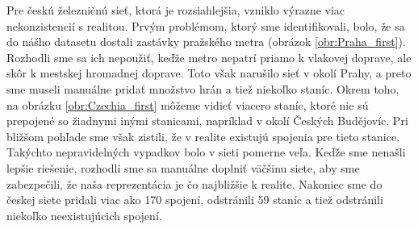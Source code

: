 \documentclass[main.tex]{subfiles}
\begin{document}
Pre českú železničnú sieť, ktorá je rozsiahlejšia, vzniklo výrazne viac nekonzistencií s realitou. Prvým problémom, ktorý sme identifikovali, bolo, že sa do nášho datasetu dostali zastávky pražského metra (obrázok \ref{obr:Praha_first}). Rozhodli sme sa ich nepoužiť, keďže metro nepatrí priamo k vlakovej doprave, ale skôr k mestskej hromadnej doprave. Toto však narušilo sieť v okolí Prahy, a preto sme museli manuálne pridať množstvo hrán a tiež niekoľko staníc. Okrem toho, na obrázku \ref{obr:Czechia_first} môžeme vidieť viacero staníc, ktoré nie sú prepojené so žiadnymi inými stanicami, napríklad v okolí Českých Budějovíc. Pri bližšom pohľade sme však zistili, že v realite existujú spojenia pre tieto stanice. Takýchto nepravidelných vypadkov bolo v sieti pomerne veľa. Keďže sme nenašli lepšie riešenie, rozhodli sme sa manuálne doplniť väčšinu siete, aby sme zabezpečili, že naša reprezentácia je čo najbližšie k realite. Nakoniec sme do českej siete pridali viac ako 170 spojení, odstránili 59 staníc a tiež odstránili niekoľko neexistujúcich spojení.





\end{document}

